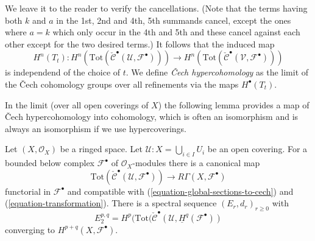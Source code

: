 We leave it to the reader to verify the cancellations. (Note that the
terms having both $k$ and $a$ in the 1st, 2nd and 4th, 5th summands
cancel, except the ones where $a = k$ which only occur in the 4th and 5th
and these cancel against each other except for the two desired terms.)
It follows that the induced map
$$
H^n(T_t) :
H^n(
\text{Tot}(\check{\mathcal{C}}^\bullet({\mathcal U}, {\mathcal F}^\bullet))
)
\to
H^n(
\text{Tot}(\check{\mathcal{C}}^\bullet({\mathcal V}, {\mathcal F}^\bullet))
)
$$
is independend of the choice of $t$. We define
{\it {\v C}ech hypercohomology} as the limit of the
{\v C}ech cohomology groups
over all refinements via the maps $H^\bullet(T_t)$.

\medskip\noindent
In the limit (over all open coverings of $X$) the following lemma provides
a map of {\v C}ech hypercohomology into cohomology, which is often an
isomorphism and is always an isomorphism if we use hypercoverings.

\begin{lemma}
\label{lemma-cech-complex-complex}
Let $(X, \mathcal{O}_X)$ be a ringed space.
Let $\mathcal{U} : X = \bigcup_{i \in I} U_i$ be
an open covering. For a bounded below complex $\mathcal{F}^\bullet$
of $\mathcal{O}_X$-modules there is a canonical map
$$
\text{Tot}(\check{\mathcal{C}}^\bullet(\mathcal{U}, \mathcal{F}^\bullet))
\longrightarrow
R\Gamma(X, \mathcal{F}^\bullet)
$$
functorial in $\mathcal{F}^\bullet$ and compatible with
(\ref{equation-global-sections-to-cech}) and (\ref{equation-transformation}).
There is a spectral sequence $(E_r, d_r)_{r \geq 0}$ with
$$
E_2^{p, q} =
H^p(\text{Tot}(\check{\mathcal{C}}^\bullet(\mathcal{U},
\underline{H}^q(\mathcal{F}^\bullet))
$$
converging to $H^{p + q}(X, \mathcal{F}^\bullet)$.
\end{lemma}

